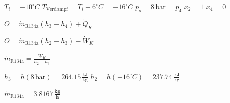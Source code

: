 \( T_i = -10^\circ C \)  
\( T_{\text{Verdampf}} = T_i - 6^\circ C = -16^\circ C \)  
\( p_s = 8 \, \text{bar} = p_4 \)  
\( x_2 = 1 \)  
\( x_4 = 0 \)  

\( O = \dot{m}_{\text{R134a}} (h_3 - h_4) + \dot{Q}_K \)  

\( O = \dot{m}_{\text{R134a}} (h_2 - h_3) - \dot{W}_K \)  

\( \dot{m}_{\text{R134a}} = \frac{\dot{W}_K}{h_2 - h_3} \)  

\( h_3 = h(8 \, \text{bar}) = 264.15 \, \frac{\text{kJ}}{\text{kg}} \)  
\( h_2 = h(-16^\circ C) = 237.74 \, \frac{\text{kJ}}{\text{kg}} \)  

\( \dot{m}_{\text{R134a}} = 3.8167 \, \frac{\text{kg}}{\text{h}} \)